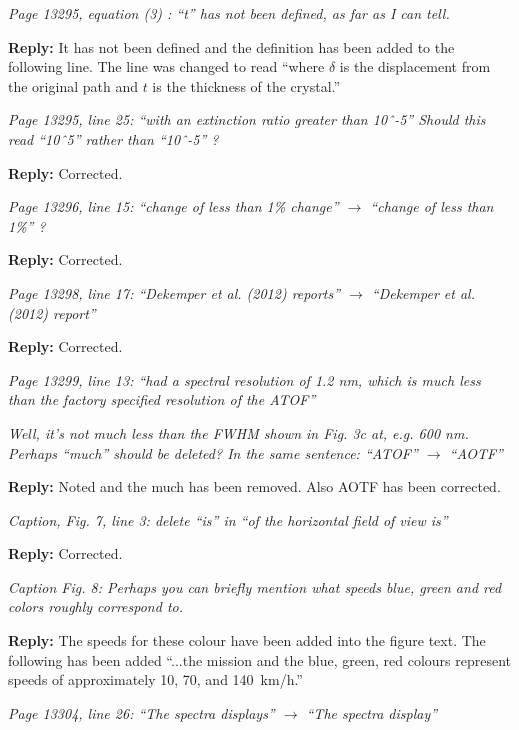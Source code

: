 \documentclass[12pt, notitlepage]{article}
\begin{document}
\textit{Page 13295, equation (3) : ``t'' has not been defined, as far as I can tell.}

\textbf{Reply:} It has not been defined and the definition has been added to the following line. The line was changed to read ``where $\delta$ is the displacement from the original path and $t$ is the thickness of the crystal.''

\hrulefill

\textit{Page 13295, line 25: ``with an extinction ratio greater than 10ˆ-5''
Should this read ``10ˆ5'' rather than ``10ˆ-5'' ?}

\textbf{Reply:} Corrected.

\hrulefill

\textit{Page 13296, line 15: ``change of less than 1\% change'' $\rightarrow$ ``change of less than 1\%'' ?}

\textbf{Reply:} Corrected.

\hrulefill

\textit{Page 13298, line 17: ``Dekemper et al. (2012) reports'' $\rightarrow$ ``Dekemper et al. (2012)
report''}

\textbf{Reply:} Corrected.

\hrulefill

\textit{Page 13299, line 13: ``had a spectral resolution of 1.2 nm, which is much less than the
factory specified resolution of the ATOF''}

\textit{Well, it's not much less than the FWHM shown in Fig. 3c at, e.g. 600 nm. Perhaps
``much'' should be deleted? In the same sentence: ``ATOF'' $\rightarrow$ ``AOTF''}

\textbf{Reply:} Noted and the much has been removed. Also AOTF has been corrected.

\hrulefill

\textit{Caption, Fig. 7, line 3: delete ``is'' in ``of the horizontal field of view is''}

\textbf{Reply:} Corrected.

\hrulefill

\textit{Caption Fig. 8: Perhaps you can briefly mention what speeds blue, green and red
colors roughly correspond to.}

\textbf{Reply:} The speeds for these colour have been added into the figure text. The following has been added ``...the
  mission and the blue, green, red colours represent speeds of approximately
  10, 70, and 140~km/h.''

\hrulefill

\textit{Page 13304, line 26: ``The spectra displays'' $\rightarrow$ ``The spectra display''}
\end{document}
